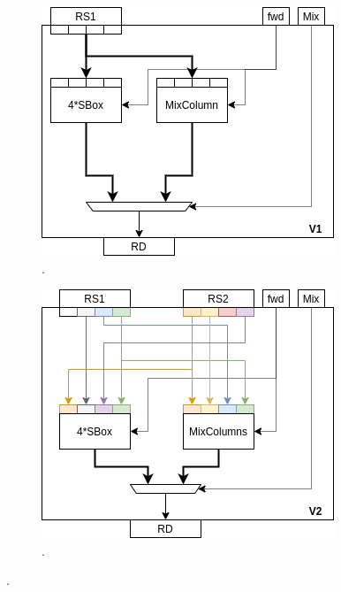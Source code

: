 

\begin{figure}[h]
\centering
\begin{subfigure}[t]{0.40\textwidth}
    \centering
    \includegraphics[width=\textwidth]{diagrams/ise-datapath-v1.png}
    \caption{.}
    \label{fig:ise:design:v1}
\end{subfigure}
\begin{subfigure}[t]{0.40\textwidth}
    \centering
    \includegraphics[width=\textwidth]{diagrams/ise-datapath-v2.png}
    \caption{.}
    \label{fig:ise:design:v2}
\end{subfigure}


\end{figure}
